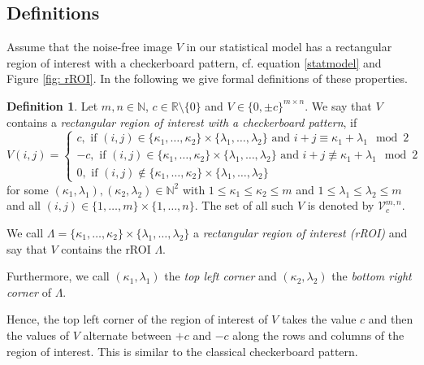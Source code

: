 \documentclass[a4paper,12pt]{article}
\theoremstyle{plain}
\theoremstyle{definition}
\newtheorem{definition}[theorem]{Definition}
\begin{document}
\subsection{Definitions}\label{section: definitions}

Assume that the noise-free image $V$ in our statistical model has a rectangular region of interest with a checkerboard pattern, cf. equation \eqref{statmodel} and Figure \ref{fig: rROI}. In the following we give formal definitions of these properties.

\begin{definition}\label{def: rROIcheckerboard}
	Let $m, n \in \mathbb{N}$, $c \in \mathbb{R} \setminus \{ 0 \}$ and $V \in \{ 0, \pm c \}^{m \times n}$. We say that $V$ contains a \emph{rectangular region of interest with a checkerboard pattern}, if
	\begin{equation}
		V(i, j) =
		\begin{cases}
			c, \textrm{ if } (i, j) \in \{ \kappa_1, \dots, \kappa_2 \} \times \{ \lambda_1, \dots, \lambda_2 \} \textrm{ and } i + j \equiv \kappa_1 + \lambda_1 \mod 2 \\
			-c, \textrm{ if } (i, j) \in \{ \kappa_1, \dots, \kappa_2 \} \times \{ \lambda_1, \dots, \lambda_2 \} \textrm{ and } i + j \not\equiv \kappa_1 + \lambda_1 \mod 2 \\
			0, \textrm{ if } (i, j) \notin \{ \kappa_1, \dots, \kappa_2 \} \times \{ \lambda_1, \dots, \lambda_2 \}
		\end{cases}
	\end{equation}
	for some $(\kappa_1, \lambda_1), (\kappa_2, \lambda_2) \in \mathbb{N}^2$ with $1 \leq \kappa_1 \leq \kappa_2 \leq m$ and $1 \leq \lambda_1 \leq \lambda_2 \leq m$ and all $(i, j) \in \{ 1, \dots, m \} \times \{ 1, \dots, n \}$. The set of all such $V$ is denoted by $\mathcal{V}_c^{m, n}$.
	
	We call $\varLambda = \{ \kappa_1, \dots, \kappa_2 \} \times \{ \lambda_1, \dots, \lambda_2 \}$ a \emph{rectangular region of interest (rROI)} and say that $V$ contains the rROI $\varLambda$.
	
	Furthermore, we call $(\kappa_1, \lambda_1)$ the \emph{top left corner} and $(\kappa_2, \lambda_2)$ the \emph{bottom right corner} of $\varLambda$.
\end{definition}

Hence, the top left corner of the region of interest of $V$ takes the value $c$ and then the values of $V$ alternate between $+c$ and $-c$ along the rows and columns of the region of interest. This is similar to the classical checkerboard pattern.
\end{document}
